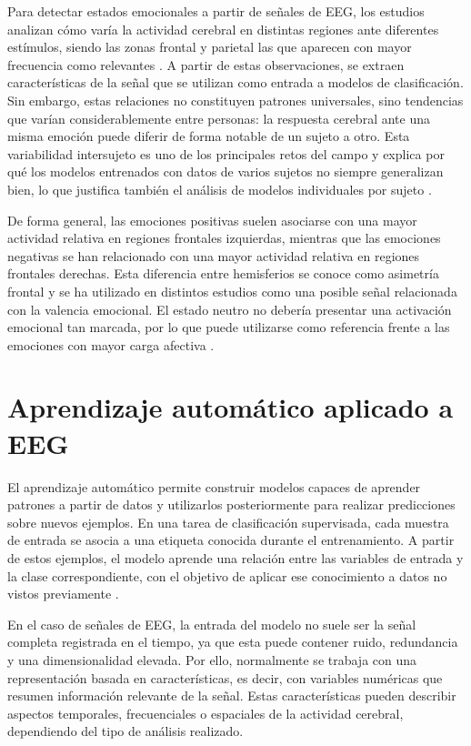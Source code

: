 Para detectar estados emocionales a partir de señales de \ac{EEG}, los estudios 
analizan cómo varía la actividad cerebral en distintas regiones ante diferentes estímulos, siendo las zonas frontal y parietal las que aparecen con mayor frecuencia como relevantes \cite{alarcao2019eeg}. A partir de estas 
observaciones, se extraen características de la señal que se utilizan como entrada a modelos de clasificación. Sin embargo, estas relaciones no constituyen patrones universales, sino tendencias que varían considerablemente entre personas: la respuesta cerebral ante una misma emoción puede diferir de forma notable de un sujeto a otro. Esta variabilidad intersujeto es uno de los principales retos del campo y explica por qué los modelos entrenados con datos de varios sujetos no siempre generalizan bien, lo que justifica también el análisis de modelos individuales por sujeto \cite{rajpoot2022subject}.

De forma general, las emociones positivas suelen asociarse con una mayor actividad relativa en regiones frontales izquierdas, mientras que las emociones negativas se han relacionado con una mayor actividad relativa en regiones frontales derechas. Esta diferencia entre hemisferios se conoce como asimetría frontal y se ha utilizado en distintos estudios como una posible señal relacionada con la valencia emocional. El estado neutro no debería presentar una activación emocional tan marcada, por lo que puede utilizarse como referencia frente a las emociones con mayor carga afectiva \cite{alarcao2019eeg}.







\section{Aprendizaje automático aplicado a EEG}

El aprendizaje automático permite construir modelos capaces de aprender patrones a partir de datos y utilizarlos posteriormente para realizar predicciones sobre nuevos ejemplos. En una tarea de clasificación supervisada, cada muestra de entrada se asocia a una etiqueta conocida durante el entrenamiento. A partir de estos ejemplos, el modelo aprende una relación entre las variables de entrada y la clase correspondiente, con el objetivo de aplicar ese conocimiento a datos no vistos previamente \cite{bishop2006pattern}.

En el caso de señales de \ac{EEG}, la entrada del modelo no suele ser la señal completa registrada en el tiempo, ya que esta puede contener ruido, redundancia y una dimensionalidad elevada. Por ello, normalmente se trabaja con una representación basada en características, es decir, con variables numéricas que resumen información relevante de la señal. Estas características pueden describir aspectos temporales, frecuenciales o espaciales de la actividad cerebral, dependiendo del tipo de análisis realizado.

